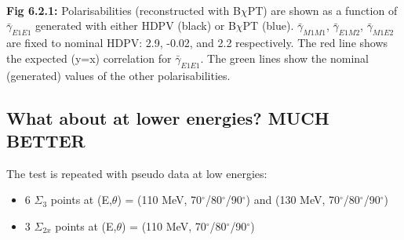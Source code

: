 \documentclass[]{article}
\begin{document}
\newpage
\begin{figure}[h!]
	\centering
	\\
	\\	
	\\		
\end{figure}

\noindent \textbf{Fig 6.2.1:} Polarisabilities (reconstructed with B$\chi$PT) are shown as a function of $\bar{\gamma}_{E1E1}$  generated with either HDPV (black) or B$\chi$PT (blue).  $\bar{\gamma}_{M1M1}$, $\bar{\gamma}_{E1M2}$, $\bar{\gamma}_{M1E2}$ are fixed to nominal HDPV: 2.9, -0.02, and 2.2 respectively. The red line shows the expected (y=x) correlation for $\bar{\gamma}_{E1E1}$. The green lines show the nominal (generated) values of the other polarisabilities.

\newpage
\subsection{What about at lower energies? MUCH BETTER}

The test is repeated with pseudo data at low energies:
\begin{itemize}
	\item 6 $\Sigma_{3}$ points at (E,$\theta$) = (110 MeV, 70$^\circ$/80$^\circ$/90$^\circ$) and (130 MeV, 70$^\circ$/80$^\circ$/90$^\circ$)
	\item 3 $\Sigma_{2x}$ points at (E,$\theta$) = (110 MeV, 70$^\circ$/80$^\circ$/90$^\circ$)
\end{itemize}
\vspace{-10mm}
\end{document}
